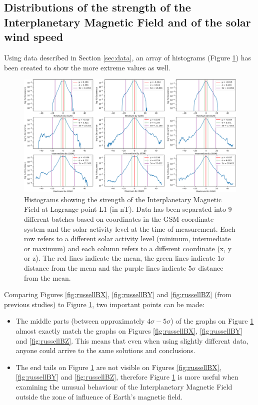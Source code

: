 \documentclass[12pt]{article}
\begin{document}
    \subsection{Distributions of the strength of the Interplanetary Magnetic Field and of the solar wind speed}
        Using data described in Section \ref{sec:data}, an array of histograms (Figure \ref{fig:hist_imf}) has been created to show the more extreme values as well.
        \begin{figure}[t!]
            \centering
            \includegraphics[width=\textwidth]{fig_introduction/hist_imf_strength.png}
            \caption{Histograms showing the strength of the Interplanetary Magnetic Field at Lagrange point L1 (in nT). Data has been separated into 9 different batches based on coordinates in the GSM coordinate system and the solar activity level at the time of measurement. Each row refers to a different solar activity level (minimum, intermediate or maximum) and each column refers to a different coordinate (x, y or z). The red lines indicate the mean, the green lines indicate $1\sigma$ distance from the mean and the purple lines indicate $5\sigma$ distance from the mean.}
            \label{fig:hist_imf}
        \end{figure}
        Comparing Figures \ref{fig:russellBX}, \ref{fig:russellBY} and \ref{fig:russellBZ} (from previous studies) to Figure \ref{fig:hist_imf}, two important points can be made:
        \begin{itemize}
            \item The middle parts (between approximately $4\sigma -5\sigma$) of the graphs on Figure \ref{fig:hist_imf} almost exactly match the graphs on Figures \ref{fig:russellBX}, \ref{fig:russellBY} and \ref{fig:russellBZ}. This means that even when using slightly different data, anyone could arrive to the same solutions and conclusions.
            \item The end tails on Figure \ref{fig:hist_imf} are not visible on Figures \ref{fig:russellBX}, \ref{fig:russellBY} and \ref{fig:russellBZ}, therefore Figure \ref{fig:hist_imf} is more useful when examining the unusual behaviour of the Interplanetary Magnetic Field outside the zone of influence of Earth's magnetic field.
        \end{itemize}
\end{document}
